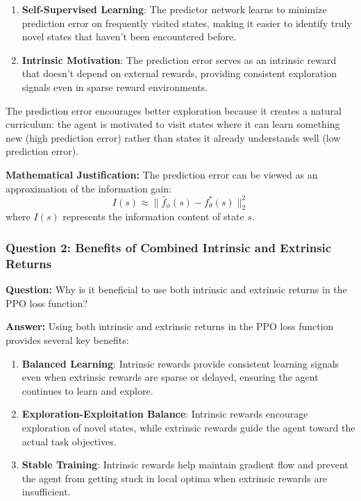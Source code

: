 \documentclass[12pt]{article}
\begin{document}
{{{\begin{enumerate}
    \item \textbf{Self-Supervised Learning}: The predictor network learns to minimize prediction error on frequently visited states, making it easier to identify truly novel states that haven't been encountered before.
    
    \item \textbf{Intrinsic Motivation}: The prediction error serves as an intrinsic reward that doesn't depend on external rewards, providing consistent exploration signals even in sparse reward environments.
\end{enumerate}

The prediction error encourages better exploration because it creates a natural curriculum: the agent is motivated to visit states where it can learn something new (high prediction error) rather than states it already understands well (low prediction error).

\textbf{Mathematical Justification:} The prediction error can be viewed as an approximation of the information gain:
\begin{equation}
I(s) \approx \|\hat{f}_\phi(s) - f^*_\theta(s)\|_2^2
\end{equation}
where $I(s)$ represents the information content of state $s$.
    
\subsubsection{Question 2: Benefits of Combined Intrinsic and Extrinsic Returns}

\textbf{Question:} Why is it beneficial to use both intrinsic and extrinsic returns in the PPO loss function?

\textbf{Answer:} Using both intrinsic and extrinsic returns in the PPO loss function provides several key benefits:

\begin{enumerate}
    \item \textbf{Balanced Learning}: Intrinsic rewards provide consistent learning signals even when extrinsic rewards are sparse or delayed, ensuring the agent continues to learn and explore.
    
    \item \textbf{Exploration-Exploitation Balance}: Intrinsic rewards encourage exploration of novel states, while extrinsic rewards guide the agent toward the actual task objectives.
    
    \item \textbf{Stable Training}: Intrinsic rewards help maintain gradient flow and prevent the agent from getting stuck in local optima when extrinsic rewards are insufficient.
    

\end{enumerate}}}}
\end{document}
